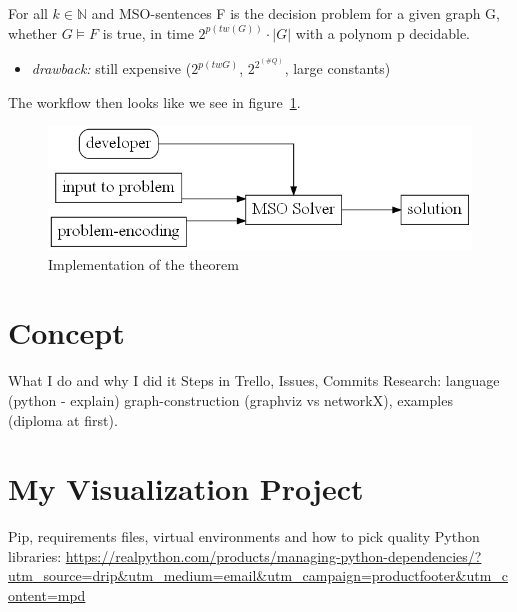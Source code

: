 \documentclass[a4paper, 12pt]{scrartcl}
\begin{document}
For all $k \in \mathbb{N}$ and MSO-sentences F is the decision problem for a given graph G, whether $G \models F$ is true, in time $2^{p(tw(G))} \cdot |G|$ with a polynom p decidable.
\begin{itemize}
	
	\item \emph{drawback:} still expensive ($2^{p(tw G)}$, $2^{2^{(\#Q)}}$, large constants) \smallskip 

\end{itemize}

The workflow then looks like we see in figure~\ref{fig:UsageCourcelle}.

\begin{figure}[H]
	\includegraphics[height=0.2\textheight]{images/UsageCourcelle.gv.png}
	\caption{Implementation of the theorem}
	\label{fig:UsageCourcelle}
\end{figure}
\newpage
\section{Concept}
What I do and why I did it
Steps in Trello, Issues, Commits
Research: language (python - explain) graph-construction (graphviz vs networkX), examples (diploma at first). 

\newpage
\section{My Visualization Project}

Pip, requirements files, virtual environments and how to pick quality Python libraries:
\url{https://realpython.com/products/managing-python-dependencies/?utm_source=drip&utm_medium=email&utm_campaign=productfooter&utm_content=mpd}
\end{document}
